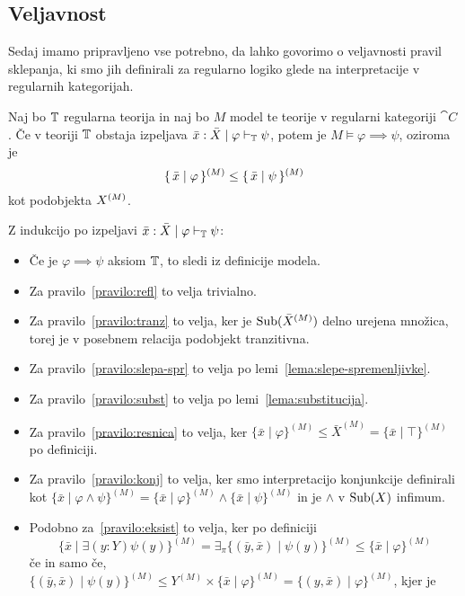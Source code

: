 \documentclass[../kategoricna_logika.tex]{subfiles}
\begin{document}
\subsection{Veljavnost}
Sedaj imamo pripravljeno vse potrebno, da lahko govorimo o veljavnosti pravil
sklepanja, ki smo jih definirali za regularno logiko glede na
interpretacije v regularnih kategorijah.
\begin{izrek}[Veljavnost]
  Naj bo $\mathbb{T}$ regularna teorija in naj bo $M$ model te teorije v
  regularni kategoriji $\cat{C}$.  Če v teoriji $\mathbb{T}$ obstaja izpeljava
  $\bar{x}:\bar{X} \mid \varphi \vdash_{\mathbb{T}} \psi$, potem je
  $M \models \varphi \implies \psi$, oziroma je
  \[\lbrace\,\bar{x}  \mid  \varphi\,\rbrace^{(M)} \leq \lbrace\,\bar{x}
       \mid  \psi\,\rbrace^{(M)}\] kot podobjekta ${X}^{(M)}$.
\end{izrek}
\begin{dokaz}
  Z indukcijo po izpeljavi $\bar{x}:\bar{X} \mid \varphi \vdash_{\mathbb{T}} \psi$:
  \begin{itemize}
  \item Če je $\varphi \implies \psi$ aksiom $\mathbb{T}$, to sledi iz
    definicije modela.
  \item Za pravilo~\ref{pravilo:refl} to velja trivialno.
  \item Za pravilo~\ref{pravilo:tranz} to velja, ker je
    $\operatorname{Sub}(\bar{X}^{(M)})$ delno urejena množica, torej je v posebnem
    relacija podobjekt tranzitivna.
  \item Za pravilo~\ref{pravilo:slepa-spr} to velja po lemi~\ref{lema:slepe-spremenljivke}.
  \item Za pravilo~\ref{pravilo:subst} to velja po lemi~\ref{lema:substitucija}.
  \item Za pravilo~\ref{pravilo:resnica} to velja, ker
    $\{\bar{x} \mid \varphi\}^{(M)} \leq \bar{X}^{(M)} = \{\bar{x} \mid
    \top\}^{(M)}$ po definiciji.
  \item Za pravilo~\ref{pravilo:konj} to velja, ker smo interpretacijo
    konjunkcije definirali kot
    $\{ \bar{x} \mid \varphi \land \psi\}^{(M)} = \{ \bar{x} \mid \varphi\}^{(M)}
    \land \{ \bar{x} \mid \psi\}^{(M)}$ in je $\land$ v $\operatorname{Sub}(X)$ infimum.
  \item Podobno za~\ref{pravilo:eksist} to velja, ker po definiciji
    \[ \{ \bar{x} \mid \exists (y:Y) \psi(y)\}^{(M)} =
      \exists_{\pi}\{(\bar{y}, \bar{x}) \mid \psi(y)\}^{(M)} \leq
      \{\bar{x} \mid \varphi\}^{(M)}\] če in samo če,
    $\{(\bar{y},\bar{x}) \mid \psi(y)\}^{(M)} \leq
    Y^{(M)} \times \{\bar{x} \mid \varphi\}^{(M)} =
    \{(y,\bar{x}) \mid \varphi\}^{(M)}$, kjer je

\end{itemize}
\end{dokaz}
\end{document}
